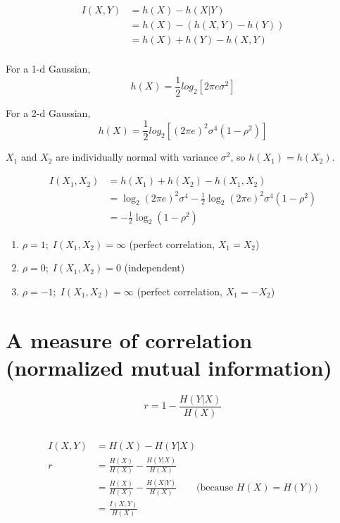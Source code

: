 \documentclass{article}
\begin{document}
\begin{align*}
  I(X,Y) &= h(X) - h(X|Y) \\
  &= h(X) - \left( h(X,Y) - h(Y) \right) \\
  &= h(X) + h(Y) - h(X,Y) \\
\end{align*}

For a 1-d Gaussian,
\[
h(X) = \frac{1}{2} log_2 \left[ 2 \pi e \sigma^2 \right]
\]

For a 2-d Gaussian,
\[
h(X) = \frac{1}{2} log_2 \left[ \left( 2 \pi e \right)^2 \sigma^4
  \left( 1 - \rho^2 \right) \right]
\]

$X_1$ and $X_2$ are individually normal with variance $\sigma^2$, so
$h(X_1) = h(X_2)$.

\begin{align*}
  I(X_1, X_2) &= h(X_1) + h(X_2) - h(X_1, X_2) \\
  &= \log_2 (2 \pi e)^2 \sigma^4 - \frac{1}{2} \log_2 (2 \pi e)^2
    \sigma^4 (1 - \rho^2) \\
  &= - \frac{1}{2} \log_2 (1 - \rho^2)
\end{align*}

\begin{enumerate}
  \item $\rho = 1; \; I(X_1, X_2) = \infty$ \qquad (perfect correlation,
    $X_1 = X_2$) \\
  \item $\rho = 0; \; I(X_1, X_2) = 0$ \qquad (independent) \\
  \item $\rho = -1; \; I(X_1, X_2) = \infty$ \qquad (perfect correlation,
    $X_1 = -X_2$) \\
\end{enumerate}

\section{A measure of correlation (normalized mutual information)}

\begin{equation*}
  r = 1 - \frac{H(Y|X)}{H(X)}
\end{equation*}

\subsection{}
\begin{align*}
  I(X,Y) &= H(X) - H(Y|X) \\
  r &= \frac{H(X)}{H(X)} - \frac{H(Y|X)}{H(X)} \\
  &=  \frac{H(X)}{H(X)} - \frac{H(X|Y)}{H(X)} \qquad \text{(because }
    H(X) = H(Y)\text{)} \\
  &= \frac{I(X,Y)}{H(X)}
\end{align*}
\end{document}
